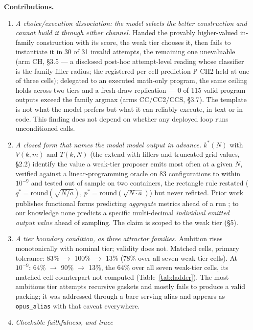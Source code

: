 \textbf{Contributions.}
\begin{enumerate}
\item \emph{A choice/execution dissociation: the model selects the better construction and cannot build it through either channel.} Handed the provably higher-valued in-family construction with its score, the weak tier chooses it, then fails to instantiate it in 30 of 31 invalid attempts, the remaining one unevaluable (arm CH, \S3.5 --- a disclosed post-hoc attempt-level reading whose classifier is the family filler radius; the registered per-cell prediction P-CH2 held at one of three cells); delegated to an executed math-only program, the same ceiling holds across two tiers and a fresh-draw replication --- 0 of 115 valid program outputs exceed the family argmax (arms CC/CC2/CCS, \S3.7). The template is not what the model prefers but what it can reliably execute, in text or in code. This finding does not depend on whether any deployed loop runs unconditioned calls.
\item \emph{A closed form that names the modal model output in advance.} $k^*(N)$ with
$V(k, m)$ and $T(k, N)$ (the extend-with-fillers and truncated-grid values, \S2.2) identify the value a weak-tier proposer emits most often at a given $N$,
verified against a linear-programming oracle on 83 configurations to within $10^{-9}$ and tested out
of sample on two containers, the rectangle rule restated ($q^* = \mathrm{round}(\sqrt{N/a})$,
$p^* = \mathrm{round}(\sqrt{N \cdot a})$) but never refitted. Prior work publishes functional forms predicting
\emph{aggregate} metrics ahead of a run \citep{kaplan2020scalinglawsneurallanguage,hoffmann2022trainingcomputeoptimallargelanguage,snell2024predictingemergentcapabilitiesfinetuning}; to our knowledge none
predicts a specific multi-decimal \emph{individual emitted output value} ahead of sampling. The claim
is scoped to the weak tier (\S5).
\item \emph{A tier boundary condition, as three attractor families.}
Ambition rises monotonically with nominal tier; validity does not. Matched cells, primary tolerance: 83\% $\rightarrow$ 100\% $\rightarrow$ 13\% (78\% over all seven weak-tier cells). At $10^{-9}$: 64\% $\rightarrow$ 90\% $\rightarrow$ 13\%, the 64\% over all seven weak-tier cells, its matched-cell counterpart not computed (Table~\ref{tab:ladder}). The most ambitious tier attempts recursive gaskets
and mostly fails to produce a valid packing; it was addressed through a bare serving alias and
appears as \texttt{opus\_alias} with that caveat everywhere.
\item \emph{Checkable faithfulness, and trace
}
\end{enumerate}
